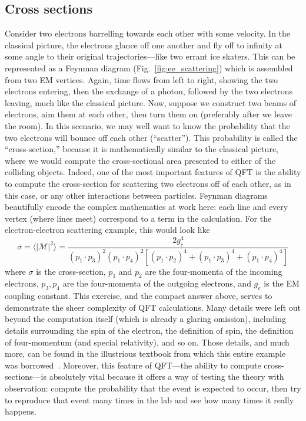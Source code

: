 \subsection{Cross sections}
Consider two electrons barrelling towards each other with some velocity. 
In the classical picture, the electrons glance off one another and fly off to infinity at some angle to their original trajectories---like two errant ice skaters. 
This can be represented as a Feynman diagram (Fig.~\ref{fig:ee_scattering}) which is assembled from two EM vertices. 
Again, time flows from left to right, showing the two electrons entering, then the exchange of a photon, followed by the two electrons leaving, much like the classical picture. 
Now, suppose we construct two beams of electrons, aim them at each other, then turn them on (preferably after we leave the room). 
In this scenario, we may well want to know the probability that the two electrons will bounce off each other (``scatter''). 
This probability is called the ``cross-section,'' because it is mathematically similar to the classical picture\footnotemark{}, where we would compute the cross-sectional area presented to either of the colliding objects. 
Indeed, one of the most important features of QFT is the ability to compute the cross-section for scattering two electrons off of each other, as in this case, or any other interactions between particles. 
Feynman diagrams beautifully encode the complex mathematics at work here: each line and every vertex (where lines meet) correspond to a term in the calculation. 
For the electron-electron scattering example, this would look like
\begin{equation}
    \sigma = \langle|\mathcal{M}|^2\rangle = \frac{2g_e^4}{(p_1 \cdot p_3)^2(p_1 \cdot p_4)^2[(p_1 \cdot p_2)^4 + (p_1 \cdot p_3)^4 + (p_1 \cdot p_4)^4]}
\end{equation}
where $\sigma$ is the cross-section, $p_1$ and $p_2$ are the four-momenta of the incoming electrons, $p_3, p_4$ are the four-momenta of the outgoing electrons, and $g_e$ is the EM coupling constant. 
This exercise, and the compact answer above, serves to demonstrate the sheer complexity of QFT calculations. 
Many details were left out beyond the computation itself (which is already a glaring omission), including details surrounding the spin of the electron, the definition of spin, the definition of four-momentum (and special relativity), and so on. 
Those details, and much more, can be found in the illustrious textbook from which this entire example was borrowed~\cite{GriffithsParticle}. 
Moreover, this feature of QFT---the ability to compute cross-sections---is absolutely vital because it offers a way of testing the theory with observation: compute the probability that the event is expected to occur, then try to reproduce that event many times in the lab and see how many times it really happens. 

